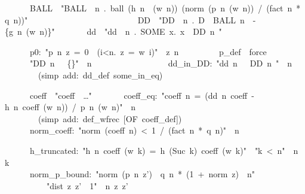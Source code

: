 \documentclass[runningheads]{llncs}
\begin{document}
\begin{isabelle}
\ \ \ \ \ \ \ BALL\ \ "BALL\ \isasymequiv \ \isasymlambda n\ \isasymepsilon .\ ball\ (h\ n\ \isasymepsilon \ (w\ n))\ (norm\ (p\ n\ (w\ n))\ /\ (fact\ n\ *\ q\ n))"\isanewline
\ \ \ \ \ \ \ \ \ \ \ \ \ \ \ \ \ \ %
\isanewline
\ \ \ \ \ \ \ DD\ \ "DD\ \isasymequiv \ \isasymlambda n\ \isasymepsilon .\ D\ \isasyminter \ BALL\ n\ \isasymepsilon \ -\ \{g\ n\ (w\ n)\}"\isanewline
\ \ \ \ \ \ \ dd\ \ "dd\ \isasymequiv \ \isasymlambda n\ \isasymepsilon .\ SOME\ x.\ x\ \isasymin \ DD\ n\ \isasymepsilon"
\end{isabelle}

\begin{isabelle}
\ \ \ \ \ \ \ p0:\ "p\ n\ z\ =\ 0\ \isasymlongleftrightarrow \ (\isasymexists i<n.\ z\ =\ w\ i)"\ \ z\ n\isanewline
\ \ \ \ \ \ \ \ \ p\_def\ \ force\isanewline
\ \ \ \ \ \ \ "DD\ n\ \isasymepsilon \ \isasymnoteq \ \{\}"\ \ n\ \isasymepsilon \isanewline
\ \ \ \ \ \ \ \ \prf\isanewline
\ \ \ \ \ \ \ \ dd\_in\_DD:\ "dd\ n\ \isasymepsilon \ \isasymin \ DD\ n\ \isasymepsilon "\ \ n\ \isasymepsilon \isanewline
\ \ \ \ \ \ \ \ \ (simp\ add:\ dd\_def\ some\_in\_eq)
\end{isabelle}

\begin{isabelle}
\ \ \ \ \ \ \ coeff\ \ "coeff\ \isasymequiv\ \ldots"\isanewline
\ \ \ \ \ \ \ coeff\_eq:\ "coeff\ n\ =\ (dd\ n\ coeff\ -\ h\ n\ coeff\ (w\ n))\ /\ p\ n\ (w\ n)"\ \ n\isanewline
\ \ \ \ \ \ \ \ \ (simp\ add:\ def\_wfrec\ [OF\ coeff\_def])\isanewline
\ \ \ \ \ \ \ norm\_coeff:\ "norm\ (coeff\ n)\ <\ 1\ /\ (fact\ n\ *\ q\ n)"\ \ n\isanewline
\ \ \ \ \ \ \ \ \ \prf
\end{isabelle}

\begin{isabelle}
\ \ \ \ \ \ \ h\_truncated:\ "h\ n\ coeff\ (w\ k)\ =\ h\ (Suc\ k)\ coeff\ (w\ k)"\ \ "k\ <\ n"\ \ n\ k\isanewline
\ \ \ \ \ \ \ \prf\isanewline
\ \ \ \ \ \ \ norm\_p\_bound:\ "norm\ (p\ n\ z')\ \isasymle \ q\ n\ *\ (1\ +\ norm\ z)\ \isacharcircum \ n"\ \isanewline
\ \ \ \ \ \ \ \ \ \ \ "dist\ z\ z'\ \isasymle \ 1"\ \ n\ z\ z'\isanewline
\ \ \ \ \ \ \ \prf
\end{isabelle}
\end{document}
